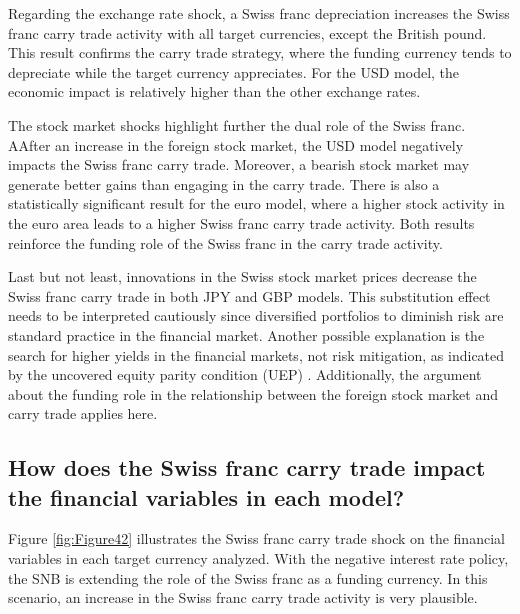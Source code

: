 \documentclass[a4paper, twoside]{templates/ociamthesis}
\begin{document}
Regarding the exchange rate shock, a Swiss franc depreciation increases the Swiss franc carry trade activity with all target currencies, except the British pound. This result confirms the carry trade strategy, where the funding currency tends to depreciate while the target currency appreciates. For the USD model, the economic impact is relatively higher than the other exchange rates.

The stock market shocks highlight further the dual role of the Swiss franc. AAfter an increase in the foreign stock market, the USD model negatively impacts the Swiss franc carry trade. Moreover, a bearish stock market may generate better gains than engaging in the carry trade. There is also a statistically significant result for the euro model, where a higher stock activity in the euro area leads to a higher Swiss franc carry trade activity. Both results reinforce the funding role of the Swiss franc in the carry trade activity.

Last but not least, innovations in the Swiss stock market prices decrease the Swiss franc carry trade in both JPY and GBP models. This substitution effect needs to be interpreted cautiously since diversified portfolios to diminish risk are standard practice in the financial market. Another possible explanation is the search for higher yields in the financial markets, not risk mitigation, as indicated by the uncovered equity parity condition (UEP) \autocite{curcuru2014}. Additionally, the argument about the funding role in the relationship between the foreign stock market and carry trade applies here.

\hypertarget{fouronetwo}{%
\subsection{How does the Swiss franc carry trade impact the financial variables in each model?}\label{fouronetwo}}

Figure \ref{fig:Figure42} illustrates the Swiss franc carry trade shock on the financial variables in each target currency analyzed. With the negative interest rate policy, the SNB is extending the role of the Swiss franc as a funding currency. In this scenario, an increase in the Swiss franc carry trade activity is very plausible.
\end{document}
